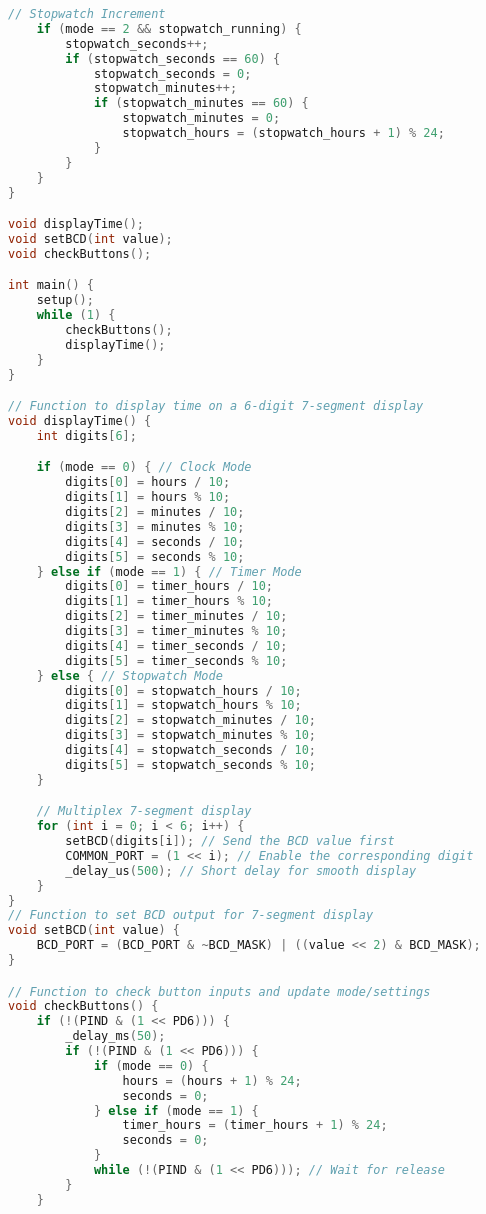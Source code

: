 \documentclass[a4paper,12pt]{article}
\theoremstyle{remark}
\begin{document}
\begin{lstlisting}[language=C++, caption= 'Code for Digital Clock']
    // Stopwatch Increment
    if (mode == 2 && stopwatch_running) {
        stopwatch_seconds++;
        if (stopwatch_seconds == 60) {
            stopwatch_seconds = 0;
            stopwatch_minutes++;
            if (stopwatch_minutes == 60) {
                stopwatch_minutes = 0;
                stopwatch_hours = (stopwatch_hours + 1) % 24;
            }
        }
    }
}

void displayTime();
void setBCD(int value);
void checkButtons();

int main() {
    setup();
    while (1) {
        checkButtons();
        displayTime();
    }
}

// Function to display time on a 6-digit 7-segment display
void displayTime() {
    int digits[6];

    if (mode == 0) { // Clock Mode
        digits[0] = hours / 10;
        digits[1] = hours % 10;
        digits[2] = minutes / 10;
        digits[3] = minutes % 10;
        digits[4] = seconds / 10;
        digits[5] = seconds % 10;
    } else if (mode == 1) { // Timer Mode
        digits[0] = timer_hours / 10;
        digits[1] = timer_hours % 10;
        digits[2] = timer_minutes / 10;
        digits[3] = timer_minutes % 10;
        digits[4] = timer_seconds / 10;
        digits[5] = timer_seconds % 10;
    } else { // Stopwatch Mode
        digits[0] = stopwatch_hours / 10;
        digits[1] = stopwatch_hours % 10;
        digits[2] = stopwatch_minutes / 10;
        digits[3] = stopwatch_minutes % 10;
        digits[4] = stopwatch_seconds / 10;
        digits[5] = stopwatch_seconds % 10;
    }

    // Multiplex 7-segment display
    for (int i = 0; i < 6; i++) {
        setBCD(digits[i]); // Send the BCD value first
        COMMON_PORT = (1 << i); // Enable the corresponding digit
        _delay_us(500); // Short delay for smooth display
    }
}
// Function to set BCD output for 7-segment display
void setBCD(int value) {
    BCD_PORT = (BCD_PORT & ~BCD_MASK) | ((value << 2) & BCD_MASK);
}

// Function to check button inputs and update mode/settings
void checkButtons() {
    if (!(PIND & (1 << PD6))) {
        _delay_ms(50);
        if (!(PIND & (1 << PD6))) {
            if (mode == 0) {
                hours = (hours + 1) % 24;
                seconds = 0;
            } else if (mode == 1) {
                timer_hours = (timer_hours + 1) % 24;
                seconds = 0;
            }
            while (!(PIND & (1 << PD6))); // Wait for release
        }
    }


\end{lstlisting}
\end{document}
